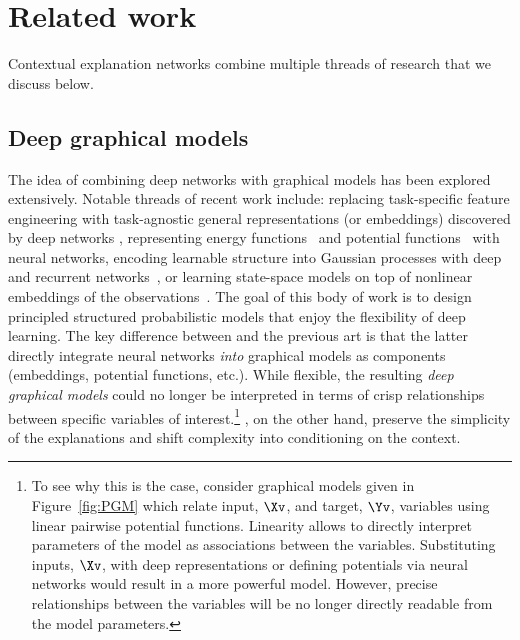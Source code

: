 \documentclass[twoside,11pt]{article}
\begin{document}
\section{Related work}\label{sec:related_work}

Contextual explanation networks combine multiple threads of research that we discuss below.

\subsection{Deep graphical models}
The idea of combining deep networks with graphical models has been explored extensively.
Notable threads of recent work include: replacing task-specific feature engineering with task-agnostic general representations (or embeddings) discovered by deep networks \citep{collobert2011natural,rudolph2016efe,rudolph2017structured}, representing energy functions~\citep{belanger2016structured} and potential functions~\citep{jaderberg2014deep} with neural networks, encoding learnable structure into Gaussian processes with deep and recurrent networks~\citep{wilson2016dkl,alshedivat2017srk}, or learning state-space models on top of nonlinear embeddings of the observations~\citep{gao2016lds,johnson2016composing,krishnan2017structured}.
The goal of this body of work is to design principled structured probabilistic models that enjoy the flexibility of deep learning.
The key difference between {\CENs} and the previous art is that the latter directly integrate neural networks \emph{into} graphical models as components (embeddings, potential functions, etc.).
While flexible, the resulting \emph{deep graphical models} could no longer be interpreted in terms of crisp relationships between specific variables of interest.\footnote{To see why this is the case, consider graphical models given in Figure~\ref{fig:PGM} which relate input, $\Xv$, and target, $\Yv$, variables using linear pairwise potential functions.
Linearity allows to directly interpret parameters of the model as associations between the variables.
Substituting inputs, $\Xv$, with deep representations or defining potentials via neural networks would result in a more powerful model.
However, precise relationships between the variables will be no longer directly readable from the model parameters.}
{\CENs}, on the other hand, preserve the simplicity of the explanations and shift complexity into conditioning on the context.
\end{document}
